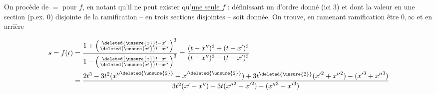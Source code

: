 On procède de $=$ pour $f$, en notant  qu'il ne peut exister qu'\uline{une seule $f$} :   définissant un  d'ordre donné (ici 3) et dont la valeur en une section (p.ex. 0) disjointe de la ramification --  en trois sections disjointes -- soit donnée. On trouve, en ramenant  ramification  être $0,\infty$ et  en arrière

\begingroup\small
\[
\begin{aligned}
s=f(t)&=\frac{1+\left(\frac{\deleted{\unsure{x}}t-x'}{\deleted{\unsure{x'}}t-x''}\right)^3}
{1-\left(\frac{\deleted{\unsure{x}}t-x'}{\deleted{\unsure{x'}}t-x''}\right)^3}
=\frac{(t-x'')^3+(t-x')^3}{(t-x'')^3-(t-x')^3}\\
&=\frac{2t^3-3t^2({x''}^{\deleted{\unsure{2}}}+{x'}^{\deleted{\unsure{2}}})+3t^{\deleted{\unsure{2}}}({x'}^{2}+{x''}^{2})-({x'}^{3}+{x''}^{3})}
{3t^2(x'-x'')+3t({x''}^{2}-{x'}^{2})-({x''}^{3}-{x'}^{3})}
\end{aligned}
\]
\endgroup

